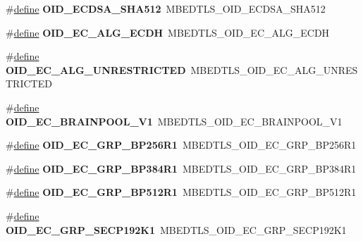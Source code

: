 \begin{DoxyCompactItemize}
\#\hyperlink{structdefine}{define} {\bfseries O\+I\+D\+\_\+\+E\+C\+D\+S\+A\+\_\+\+S\+H\+A512}~M\+B\+E\+D\+T\+L\+S\+\_\+\+O\+I\+D\+\_\+\+E\+C\+D\+S\+A\+\_\+\+S\+H\+A512
\item 
\mbox{\label{compat-1_83_8h_a3b9185bd074afe20f501616b12e00b7f}} 
\#\hyperlink{structdefine}{define} {\bfseries O\+I\+D\+\_\+\+E\+C\+\_\+\+A\+L\+G\+\_\+\+E\+C\+DH}~M\+B\+E\+D\+T\+L\+S\+\_\+\+O\+I\+D\+\_\+\+E\+C\+\_\+\+A\+L\+G\+\_\+\+E\+C\+DH
\item 
\mbox{\label{compat-1_83_8h_a6115477e9e9f7bae09e7a83224165c73}} 
\#\hyperlink{structdefine}{define} {\bfseries O\+I\+D\+\_\+\+E\+C\+\_\+\+A\+L\+G\+\_\+\+U\+N\+R\+E\+S\+T\+R\+I\+C\+T\+ED}~M\+B\+E\+D\+T\+L\+S\+\_\+\+O\+I\+D\+\_\+\+E\+C\+\_\+\+A\+L\+G\+\_\+\+U\+N\+R\+E\+S\+T\+R\+I\+C\+T\+ED
\item 
\mbox{\label{compat-1_83_8h_a4be32a44be62a8fd730fb7c5a01d7fc2}} 
\#\hyperlink{structdefine}{define} {\bfseries O\+I\+D\+\_\+\+E\+C\+\_\+\+B\+R\+A\+I\+N\+P\+O\+O\+L\+\_\+\+V1}~M\+B\+E\+D\+T\+L\+S\+\_\+\+O\+I\+D\+\_\+\+E\+C\+\_\+\+B\+R\+A\+I\+N\+P\+O\+O\+L\+\_\+\+V1
\item 
\mbox{\label{compat-1_83_8h_a672793a748d9f544a9f3c5b1cb5f151d}} 
\#\hyperlink{structdefine}{define} {\bfseries O\+I\+D\+\_\+\+E\+C\+\_\+\+G\+R\+P\+\_\+\+B\+P256\+R1}~M\+B\+E\+D\+T\+L\+S\+\_\+\+O\+I\+D\+\_\+\+E\+C\+\_\+\+G\+R\+P\+\_\+\+B\+P256\+R1
\item 
\mbox{\label{compat-1_83_8h_ae0e3218cfb47636b4fd43bd2ffefe111}} 
\#\hyperlink{structdefine}{define} {\bfseries O\+I\+D\+\_\+\+E\+C\+\_\+\+G\+R\+P\+\_\+\+B\+P384\+R1}~M\+B\+E\+D\+T\+L\+S\+\_\+\+O\+I\+D\+\_\+\+E\+C\+\_\+\+G\+R\+P\+\_\+\+B\+P384\+R1
\item 
\mbox{\label{compat-1_83_8h_adf93a0b60ff1f8d2ab31046b4c40f6d9}} 
\#\hyperlink{structdefine}{define} {\bfseries O\+I\+D\+\_\+\+E\+C\+\_\+\+G\+R\+P\+\_\+\+B\+P512\+R1}~M\+B\+E\+D\+T\+L\+S\+\_\+\+O\+I\+D\+\_\+\+E\+C\+\_\+\+G\+R\+P\+\_\+\+B\+P512\+R1
\item 
\mbox{\label{compat-1_83_8h_ab055d672f1db76103ef82d19581736b2}} 
\#\hyperlink{structdefine}{define} {\bfseries O\+I\+D\+\_\+\+E\+C\+\_\+\+G\+R\+P\+\_\+\+S\+E\+C\+P192\+K1}~M\+B\+E\+D\+T\+L\+S\+\_\+\+O\+I\+D\+\_\+\+E\+C\+\_\+\+G\+R\+P\+\_\+\+S\+E\+C\+P192\+K1

\end{DoxyCompactItemize}
